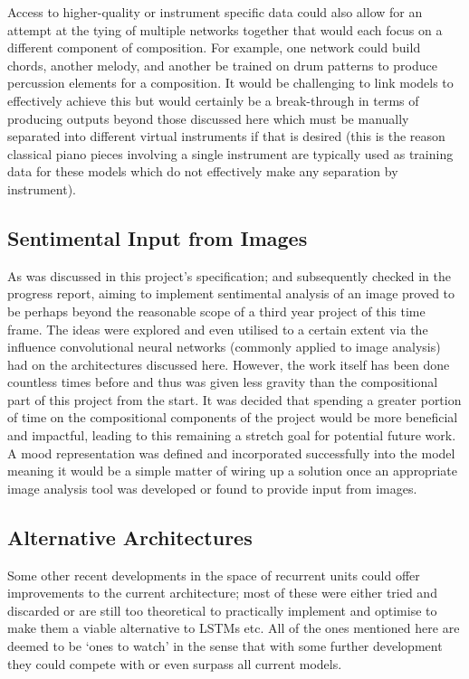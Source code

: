 \documentclass[12pt,]{article}
\begin{document}
Access to higher-quality or instrument specific data could also allow
for an attempt at the tying of multiple networks together that would
each focus on a different component of composition. For example, one
network could build chords, another melody, and another be trained on
drum patterns to produce percussion elements for a composition. It would
be challenging to link models to effectively achieve this but would
certainly be a break-through in terms of producing outputs beyond those
discussed here which must be manually separated into different virtual
instruments if that is desired (this is the reason classical piano
pieces involving a single instrument are typically used as training data
for these models which do not effectively make any separation by
instrument).

\hypertarget{sentimental-input-from-images}{%
\subsection{Sentimental Input from
Images}\label{sentimental-input-from-images}}

As was discussed in this project's specification; and subsequently
checked in the progress report, aiming to implement sentimental analysis
of an image proved to be perhaps beyond the reasonable scope of a third
year project of this time frame. The ideas were explored and even
utilised to a certain extent via the influence convolutional neural
networks (commonly applied to image analysis) had on the architectures
discussed here. However, the work itself has been done countless times
before and thus was given less gravity than the compositional part of
this project from the start. It was decided that spending a greater
portion of time on the compositional components of the project would be
more beneficial and impactful, leading to this remaining a stretch goal
for potential future work. A mood representation was defined and
incorporated successfully into the model meaning it would be a simple
matter of wiring up a solution once an appropriate image analysis tool
was developed or found to provide input from images.

\hypertarget{alternative-architectures}{%
\subsection{Alternative Architectures}\label{alternative-architectures}}

Some other recent developments in the space of recurrent units could
offer improvements to the current architecture; most of these were
either tried and discarded or are still too theoretical to practically
implement and optimise to make them a viable alternative to LSTMs etc.
All of the ones mentioned here are deemed to be `ones to watch' in the
sense that with some further development they could compete with or even
surpass all current models.
\end{document}
